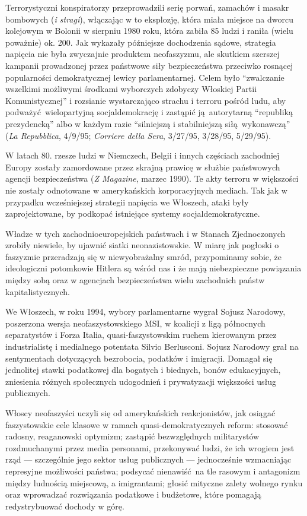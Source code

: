 \documentclass[12pt]{book}
\begin{document}
Terrorystyczni konspiratorzy przeprowadzili serię porwań, zamachów i masakr bombowych (\textit{i stragi}), włączając w to eksplozję, która miała miejsce na dworcu kolejowym w Bolonii w sierpniu 1980 roku, która zabiła 85 ludzi i raniła (wielu poważnie) ok. 200. Jak wykazały późniejsze dochodzenia sądowe, strategia napięcia nie była zwyczajnie produktem neofaszyzmu, ale skutkiem szerszej kampanii prowadzonej przez państwowe siły bezpieczeństwa przeciwko rosnącej popularności demokratycznej lewicy parlamentarnej. Celem było ``zwalczanie wszelkimi możliwymi środkami wyborczych zdobyczy Włoskiej Partii Komunistycznej'' i rozsianie wystarczająco strachu i terroru pośród ludu, aby podważyć wielopartyjną socjaldemokrację i zastąpić ją autorytarną ``republiką prezydencką'' albo w każdym razie ``silniejszą i stabilniejszą siłą wykonawczą'' (\textit{La Repubblica}, 4/9/95; \textit{Corriere della Sera}, 3/27/95, 3/28/95, 5/29/95).

W latach 80. rzesze ludzi w Niemczech, Belgii i innych częściach zachodniej Europy zostały zamordowane przez skrajną prawicę w służbie państwowych agencji bezpieczeństwa (\textit{Z Magazine}, marzec 1990). Te akty terroru w większości nie zostały odnotowane w amerykańskich korporacyjnych mediach. Tak jak w przypadku wcześniejszej strategii napięcia we Włoszech, ataki były zaprojektowane, by podkopać istniejące systemy socjaldemokratyczne.

Władze w tych zachodnioeuropejskich państwach i w Stanach Zjednoczonych zrobiły niewiele, by ujawnić siatki neonazistowskie. W miarę jak pogłoski o faszyzmie przeradzają się w niewyobrażalny smród, przypominamy sobie, że ideologiczni potomkowie Hitlera są wśród nas i że mają niebezpieczne powiązania między sobą oraz w agencjach bezpieczeństwa wielu zachodnich państw kapitalistycznych.

We Włoszech, w roku 1994, wybory parlamentarne wygrał Sojusz Narodowy, poszerzona wersja neofaszystowskiego MSI, w koalicji z ligą północnych separatystów i Forza Italia, quasi-faszystowskim ruchem kierowanym przez industrialistę i medialnego potentata Silvio Berlusconi. Sojusz Narodowy grał na sentymentach dotyczących bezrobocia, podatków i imigracji. Domagał się jednolitej stawki podatkowej dla bogatych i biednych, bonów edukacyjnych, zniesienia różnych społecznych udogodnień i prywatyzacji większości usług publicznych.

Włoscy neofaszyści uczyli się od amerykańskich reakcjonistów, jak osiągać faszystowskie cele klasowe w ramach quasi-demokratycznych reform: stosować radosny, reaganowski optymizm; zastąpić bezwzględnych militarystów rozdmuchanymi przez media personami, przekonywać ludzi, że ich wrogiem jest rząd — szczególnie jego sektor usług publicznych — jednocześnie wzmacniając represyjne możliwości państwa; podsycać nienawiść na tle rasowym i antagonizm między ludnością miejscową, a imigrantami; głosić mityczne zalety wolnego rynku oraz wprowadzać rozwiązania podatkowe i budżetowe, które pomagają redystrybuować dochody w górę.
\end{document}
